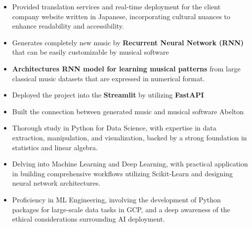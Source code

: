 \documentclass[10pt,a4paper,ragged2e,withhyper]{altacv}
\begin{document}
\begin{paracol}{2}
\begin{itemize}
\item Provided translation services and real-time deployment for the client company website written in Japanese, incorporating cultural nuances to enhance readability and accessibility.
\end{itemize}
\medskip


\begin{itemize}
\item Generates completely new music by {\bf Recurrent Neural Network (RNN)} that can be easily customizable by musical software
\item {\bf Architectures RNN model for learning musical patterns} from large classical music datasets that are expressed in numerical format. 
\item Deployed the project into the {\bf Streamlit} by utilizing {\bf FastAPI}
\item Built the connection between generated music and musical software Abelton
\end{itemize}
\medskip



\begin{itemize}
\item Thorough study in Python for Data Science, with expertise in data extraction, manipulation, and visualization, backed by a strong foundation in statistics and linear algebra.
\item Delving into Machine Learning and Deep Learning, with practical application in building comprehensive workflows utilizing Scikit-Learn and designing neural network architectures.
\item Proficiency in ML Engineering, involving the development of Python packages for large-scale data tasks in GCP, and a deep awareness of the ethical considerations surrounding AI deployment.
\end{itemize}
\divider


\end{paracol}
\end{document}
